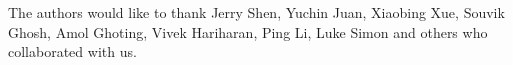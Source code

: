 The authors would like to thank Jerry Shen, Yuchin Juan, Xiaobing Xue, Souvik Ghosh, Amol Ghoting, Vivek Hariharan, Ping Li, Luke Simon and others who collaborated with us.
